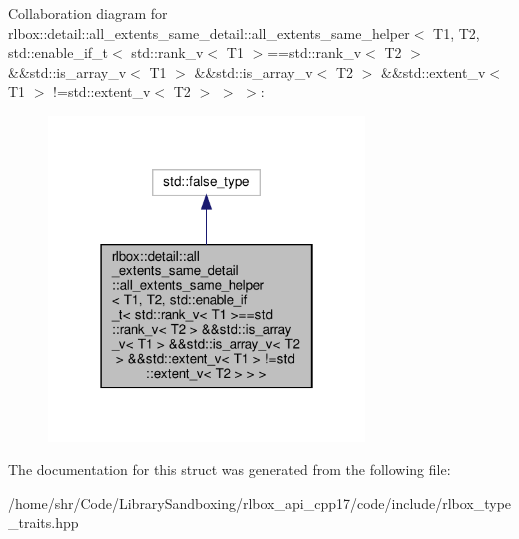 Collaboration diagram for rlbox\+:\+:detail\+:\+:all\+\_\+extents\+\_\+same\+\_\+detail\+:\+:all\+\_\+extents\+\_\+same\+\_\+helper$<$ T1, T2, std\+:\+:enable\+\_\+if\+\_\+t$<$ std\+:\+:rank\+\_\+v$<$ T1 $>$==std\+:\+:rank\+\_\+v$<$ T2 $>$ \&\&std\+:\+:is\+\_\+array\+\_\+v$<$ T1 $>$ \&\&std\+:\+:is\+\_\+array\+\_\+v$<$ T2 $>$ \&\&std\+:\+:extent\+\_\+v$<$ T1 $>$ !=std\+:\+:extent\+\_\+v$<$ T2 $>$ $>$ $>$\+:\nopagebreak
\begin{figure}[H]
\begin{center}
\leavevmode
\includegraphics[width=238pt]{structrlbox_1_1detail_1_1all__extents__same__detail_1_1all__extents__same__helper_3_01T1_00_01T2c99e36052fc437e6782967e2a051d51d}
\end{center}
\end{figure}


The documentation for this struct was generated from the following file\+:\begin{DoxyCompactItemize}
\item 
/home/shr/\+Code/\+Library\+Sandboxing/rlbox\+\_\+api\+\_\+cpp17/code/include/rlbox\+\_\+type\+\_\+traits.\+hpp\end{DoxyCompactItemize}
